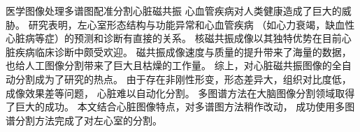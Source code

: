 
\begin{Cabstract}{医学图像处理}{多谱图}{配准}{分割}{心脏磁共振}
  心血管疾病对人类健康造成了巨大的威胁。
  研究表明，左心室形态结构与功能异常和心血管疾病
  （如心力衰竭，缺血性心脏病等症）的预测和诊断有直接的关系。
  核磁共振成像以其独特优势在目前心脏疾病临床诊断中颇受欢迎。
  磁共振成像速度与质量的提升带来了海量的数据，
  也给人工图像分割带来了巨大且枯燥的工作量。
  综上，对心脏磁共振图像的全自动分割成为了研究的热点。
  由于存在非刚性形变，形态差异大，组织对比度低，成像效果差等问题，
  心脏难以自动化分割。
  多图谱方法在大脑图像分割领域取得了巨大的成功。
  本文结合心脏图像特点，对多谱图方法稍作改动，
  成功使用多图谱分割方法完成了对左心室的分割。
\end{Cabstract}

